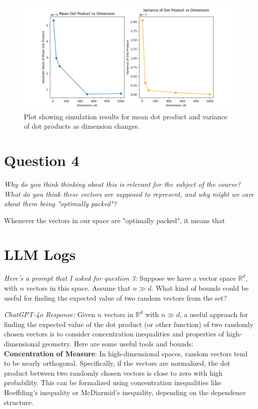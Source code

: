 \documentclass[hidelinks]{article}
\begin{document}
	\begin{figure}[h]
		\centering
		\includegraphics[width=6in]{simfig.png}
		\caption{Plot showing simulation results for mean dot product and variance of dot products as dimension changes.}
	\end{figure}
	\newpage
	
	\section{Question 4}
	\textit{Why do you think thinking about this is relevant for the subject of the course? What do you think these vectors are supposed to represent, and why might we care about them being "optimally packed"?}
	
	Whenever the vectors in our space are "optimally packed", it means that 
	\newpage
	
	\section{LLM Logs}
	
	\textit{Here's a prompt that I asked for question 3: } Suppose we have a vector space $\mathbb{R}^d$, with $n$ vectors in this space. Assume that $n \gg d$. What kind of bounds could be useful for finding the expected value of two random vectors from the set?
	
	\textit{ChatGPT-4o Response: }Given $n$ vectors in $\mathbb{R}^d$ with $n \gg d$, a useful approach for finding the expected value of the dot product (or other function) of two randomly chosen vectors is to consider concentration inequalities and properties of high-dimensional geometry. Here are some useful tools and bounds:\\
	
	\textbf{Concentration of Measure}: In high-dimensional spaces, random vectors tend to be nearly orthogonal. Specifically, if the vectors are normalized, the dot product between two randomly chosen vectors is close to zero with high probability. This can be formalized using concentration inequalities like Hoeffding's inequality or McDiarmid's inequality, depending on the dependence structure.\\
	
\end{document}
